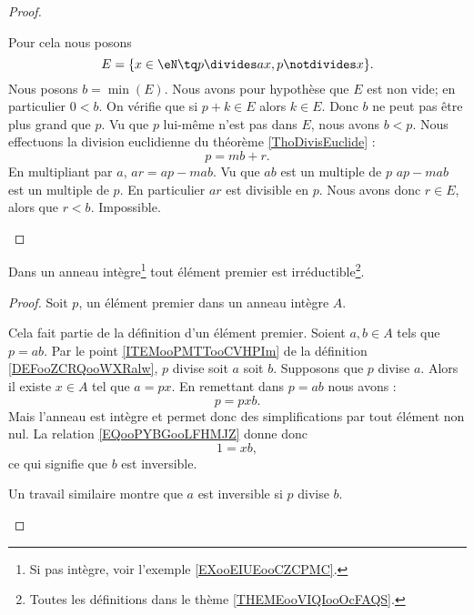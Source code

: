 \begin{proof}
\begin{subproof}
\begin{enumerate}
			      \begin{subproof}
				      \spitem[Un ensemble]
				      Pour cela nous posons
				      \begin{equation}
					      E=\{ x\in \eN\tq p\divides ax, p\notdivides x  \}.
				      \end{equation}
				      Nous posons \( b=\min(E)\). Nous avons pour hypothèse que \( E\) est non vide; en particulier \( 0<b\).
				      \spitem[\( b<p\)]
				      On vérifie que si \( p+k\in E\) alors \( k\in E\). Donc \( b\) ne peut pas être plus grand que \( p\). Vu que \( p\) lui-même n'est pas dans \( E\), nous avons \( b<p\).
				      Nous effectuons la division euclidienne du théorème \ref{ThoDivisEuclide} :
				      \begin{equation}
					      p=mb+r.
				      \end{equation}
				      En multipliant par \( a\), \( ar=ap-mab\). Vu que \( ab\) est un multiple de \( p\) \( ap-mab\) est un multiple de \( p\). En particulier \( ar\) est divisible en \( p\).
				      \spitem[La contradiction]
				      Nous avons donc \( r\in E\), alors que \( r<b\). Impossible.
			      \end{subproof}
		\end{enumerate}
	\end{subproof}
\end{proof}

\begin{proposition}     \label{PROPooWMNPooZdvOBt}
	Dans un anneau intègre\footnote{Si pas intègre, voir l'exemple \ref{EXooEIUEooCZCPMC}.} tout élément premier est irréductible\footnote{Toutes les définitions dans le thème \ref{THEMEooVIQIooOcFAQS}.}.
\end{proposition}

\begin{proof}
	Soit \( p\), un élément premier dans un anneau intègre \( A\).
	\begin{subproof}
		Cela fait partie de la définition d'un élément premier.
		Soient \( a,b\in A\) tels que \( p=ab\). Par le point \ref{ITEMooPMTTooCVHPIm} de la définition \ref{DEFooZCRQooWXRalw}, \( p\) divise soit \( a\) soit \( b\). Supposons que \( p\) divise \( a\). Alors il existe \( x\in A\) tel que \( a=px\). En remettant dans \( p=ab\) nous avons :
		\begin{equation}        \label{EQooPYBGooLFHMJZ}
			p=pxb.
		\end{equation}
		Mais l'anneau est intègre et permet donc des simplifications par tout élément non nul. La relation \ref{EQooPYBGooLFHMJZ} donne donc
		\begin{equation}
			1=xb,
		\end{equation}
		ce qui signifie que \( b\) est inversible.

		Un travail similaire montre que \( a\) est inversible si \( p\) divise \( b\).
	\end{subproof}
\end{proof}

